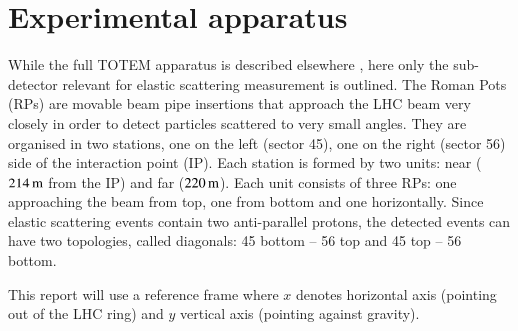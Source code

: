 \section{Experimental apparatus}

While the full TOTEM apparatus is described elsewhere \cite{totem-jinst}, here only the sub-detector
relevant for elastic scattering measurement is outlined. The Roman Pots (RPs) are movable beam pipe
insertions that approach the LHC beam very closely in order to detect particles scattered to very 
small angles. They are organised in two stations, one on the left (sector 45), one on the right
(sector 56) side of the interaction point (IP). Each station is formed by two units: near ($214\,{\rm m}$
from the IP) and far ($220\,{\rm m}$). Each unit consists of three RPs: one approaching the beam from top,
one from bottom and one horizontally. Since elastic scattering events contain two anti-parallel protons,
the detected events can have two topologies, called diagonals: 45 bottom -- 56 top and 45 top -- 56 bottom.

This report will use a reference frame where $x$ denotes horizontal axis (pointing out of the LHC ring) and $y$ vertical axis (pointing against gravity).
